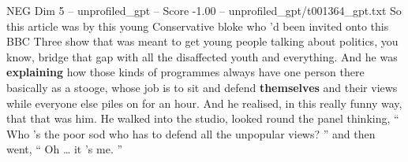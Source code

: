\begin{textsample}{NEG Dim 5 – unprofiled\_gpt – Score -1.00 – unprofiled\_gpt/t001364\_gpt.txt}  \label{ex:f5_neg_013}
So this article was by this young Conservative bloke who ’d been invited onto this BBC Three show that was meant to get young people talking about politics, you know, bridge that gap with all the disaffected youth and everything.
And he was \textbf{explaining} how those kinds of programmes always have one person there basically as a stooge, whose job is to sit and defend \textbf{themselves} and their views while everyone else piles on for an hour.
And he realised, in this really funny way, that that was him.
He walked into the studio, looked round the panel thinking, “ Who ’s the poor sod who has to defend all the unpopular views? ” and then went, “ Oh … it ’s me. ”

\end{textsample}
